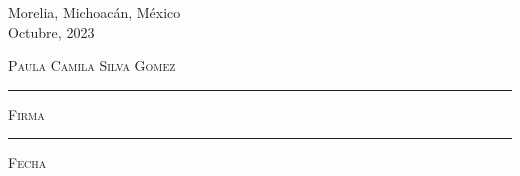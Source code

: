 \documentclass[11pt]{book}
\begin{document}
\begin{titlepage}
\begin{center}
\vfill

\begin{center}
{Morelia, Michoacán, México}\\
{Octubre, 2023}
\end{center}

\end{center}
\end{titlepage}


\thispagestyle{empty}
\vspace*{\fill}
\begingroup

\centering

\hspace{5em}

\textsc{Paula Camila Silva Gomez}

\vspace{5em}

\rule[1em]{20em}{0.5pt} %

\textsc{Firma}
 
\vspace{5em}

\rule[1em]{20em}{0.5pt} %

\textsc{Fecha}

\endgroup
\vspace*{\fill}




\end{document}
